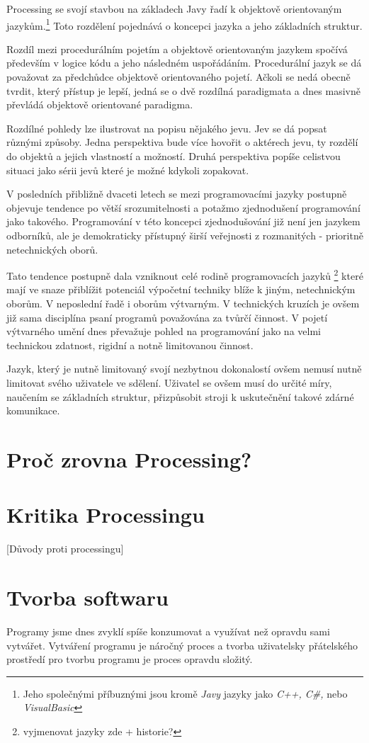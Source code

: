 \documentclass[10pt,twopage]{book}
\newcommand{\oddil}[1]{\section{#1}\label{sec:#1}}
\begin{document}
Processing se svojí stavbou na základech Javy řadí k objektově orientovaným jazykům.\footnote{ Jeho společnými příbuznými jsou kromě {\em Javy} jazyky jako {\em C++, C\#,} nebo {\em VisualBasic}} Toto rozdělení pojednává o koncepci jazyka a jeho základních struktur. 

Rozdíl mezi procedurálním pojetím a objektově orientovaným jazykem spočívá především v logice kódu a jeho následném uspořádáním. Procedurální jazyk se dá považovat za předchůdce objektově orientovaného pojetí. Ačkoli se nedá obecně tvrdit, který přístup je lepší, jedná se o dvě rozdílná paradigmata a dnes masivně převládá objektově orientované paradigma.

Rozdílné pohledy lze ilustrovat na popisu nějakého jevu. Jev se dá popsat různými způsoby. Jedna perspektiva bude více hovořit o aktérech jevu, ty rozdělí do objektů a jejich vlastností a možností. Druhá perspektiva popíše celistvou situaci jako sérii jevů které je možné kdykoli zopakovat.


V posledních přibližně dvaceti letech se mezi programovacími jazyky postupně objevuje tendence po větší srozumitelnosti a potažmo zjednodušení programování jako takového. Programování v této koncepci zjednodušování již není jen jazykem odborníků, ale je demokraticky přístupný širší veřejnosti z rozmanitých - prioritně netechnických oborů.

Tato tendence postupně dala vzniknout celé rodině programovacích jazyků
\footnote{vyjmenovat jazyky zde + historie?}
které mají ve snaze přiblížit potenciál výpočetní techniky blíže k jiným, netechnickým oborům. V neposlední řadě i oborům výtvarným. V technických kruzích je ovšem již sama disciplína psaní programů považována za tvůrčí činnost. V pojetí výtvarného umění dnes převažuje pohled na programování jako na velmi technickou zdatnost, rigidní a notně limitovanou činnost.

Jazyk, který je nutně limitovaný svojí nezbytnou dokonalostí ovšem nemusí nutně limitovat svého uživatele ve sdělení. Uživatel se ovšem musí do určité míry, naučením se základních struktur, přizpůsobit stroji k uskutečnění takové zdárné komunikace.


\oddil{Proč zrovna Processing?}

\oddil{Kritika Processingu}

[Důvody proti processingu]

\oddil{Tvorba softwaru}

Programy jsme dnes zvyklí spíše konzumovat a využívat než opravdu sami vytvářet. Vytváření programu je náročný proces a tvorba uživatelsky přátelského prostředí pro tvorbu programu je proces opravdu složitý.
\end{document}
